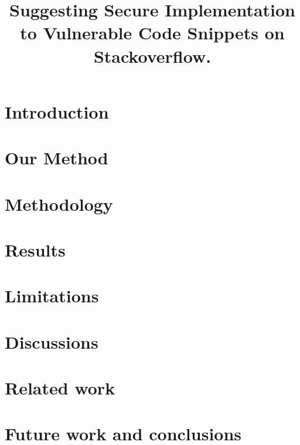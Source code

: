 \documentclass[sigconf]{acmart}
\begin{document}
\title{Suggesting Secure Implementation to Vulnerable Code Snippets on Stackoverflow.}
\begin{abstract}  
\end{abstract}
\maketitle
\section{Introduction}

\section{Our Method}

\section{Methodology}

\section{Results}
      
\section{Limitations}
\section{Discussions}
\section{Related work}
\section{Future work and conclusions}



  

\end{document}
